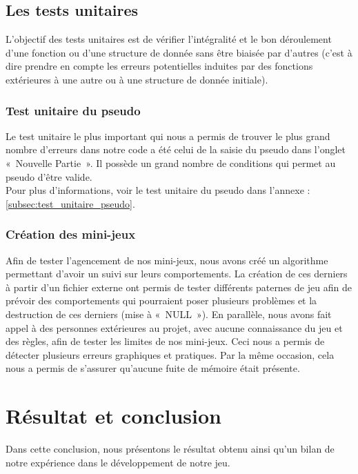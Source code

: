 \documentclass[12pt,a4paper]{article}
\begin{document}
         \subsection{Les tests unitaires}
            \tabto{1cm} L’objectif des tests unitaires est de vérifier l’intégralité et le bon déroulement d’une fonction ou d’une structure de donnée sans être biaisée par d’autres (c’est à dire prendre en compte les erreurs potentielles induites par des fonctions extérieures à une autre ou à une structure de donnée initiale).

            \subsubsection{Test unitaire du pseudo}
                \tabto{1cm} Le test unitaire le plus important qui nous a permis de trouver le plus grand nombre d'erreurs dans notre code a été celui de la saisie du pseudo dans l'onglet «~Nouvelle Partie~». Il possède un grand nombre de conditions qui permet au pseudo d'être valide.\\
                Pour plus d'informations, voir le test unitaire du pseudo dans l'annexe : \ref{subsec:test_unitaire_pseudo}.
                
            \subsubsection{Création des mini-jeux}
                \tabto{1cm} Afin de tester l’agencement de nos mini-jeux, nous avons créé un algorithme permettant d’avoir un suivi sur leurs comportements. La création de ces derniers à partir d’un fichier externe ont permis de tester différents paternes de jeu afin de prévoir des comportements qui pourraient poser plusieurs problèmes et la destruction de ces derniers (mise à «~NULL~»). En parallèle, nous avons fait appel à des personnes extérieures au projet, avec aucune connaissance du jeu et des règles, afin de tester les limites de nos mini-jeux. Ceci nous a permis de détecter plusieurs erreurs graphiques et pratiques. Par la même occasion, cela nous a permis de s’assurer qu’aucune fuite de mémoire était présente.
            
    \newpage

    \section{Résultat et conclusion}
        \tabto{1cm} Dans cette conclusion, nous présentons le résultat obtenu ainsi qu'un bilan de notre expérience dans le développement de notre jeu.\\
\end{document}
